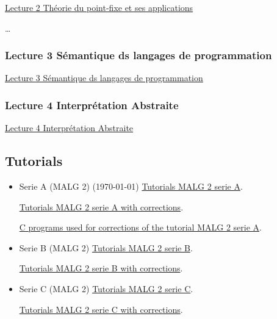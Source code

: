 \documentclass[ 12pt]{article}
\begin{document}
   \href{http://mery54.github.io/teaching/movex/lecturesnotes/malglecture2.pdf}{Lecture
     2  Théorie du point-fixe et ses applications}
   

   \ldots
   
   \subsubsection{Lecture 3 {Sémantique ds langages de programmation}}

   \href{http://mery54.github.io/teaching/movex/lecturesnotes/malglecture3.pdf}{Lecture
     3 Sémantique ds langages de programmation}
   

   \subsubsection{Lecture 4 {Interprétation Abstraite}}

   \href{http://mery54.github.io/teaching/movex/lecturesnotes/malglecture4.pdf}{Lecture
     4 Interprétation Abstraite}
   


\subsection{Tutorials}



\begin{itemize}
  
  \item[]   Serie  A (MALG 2)  (\today)
    \href{http://mery54.github.io/teaching/movex/lecturesnotes/malgserieA.pdf}{Tutorials 
      MALG 2        serie A}.

       \href{http://mery54.github.io/teaching/movex/lecturesnotes/cmalgserieA.pdf}{Tutorials 
         MALG 2        serie A with corrections}.

        \href{http://mery54.github.io/teaching/movex/models/serieDD.zip}{C
          programs  used for corrections of the tutorial  MALG 2        serie A}.




       

    \item[]   Serie  B (MALG 2)
    \href{http://mery54.github.io/teaching/movex/lecturesnotes/malgserieB.pdf}{Tutorials 
      MALG 2        serie B}.

       \href{http://mery54.github.io/teaching/movex/lecturesnotes/correctionmalgserieB.pdf}{Tutorials 
      MALG 2        serie B with corrections}.

     \item[]   Serie  C (MALG 2)
    \href{http://mery54.github.io/teaching/movex/lecturesnotes/malgserieC.pdf}{Tutorials 
      MALG 2        serie C}.

       \href{http://mery54.github.io/teaching/movex/lecturesnotes/correctionmalgserieC.pdf}{Tutorials 
      MALG 2        serie C with corrections}.

   \end{itemize}
  
\end{document}
